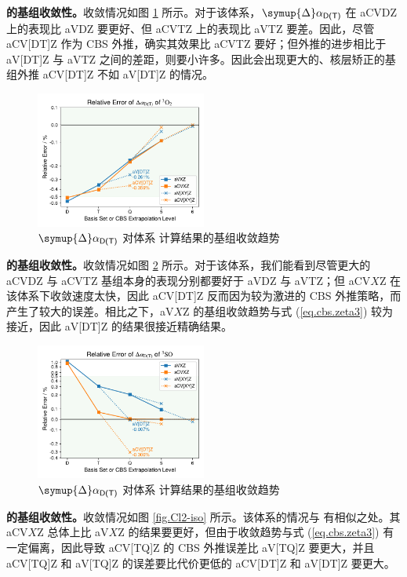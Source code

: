 \textbf{ 的基组收敛性。}收敛情况如图 \ref{fig.O2-iso} 所示。对于该体系，$\symup{\Delta} \alpha_\textsf{D(T)}$ 在 aCVDZ 上的表现比 aVDZ 要更好、但 aCVTZ 上的表现比 aVTZ 要差。因此，尽管 aCV[DT]Z 作为 CBS 外推，确实其效果比 aCVTZ 要好；但外推的进步相比于 aV[DT]Z 与 aVTZ 之间的差距，则要小许多。因此会出现更大的、核层矫正的基组外推 aCV[DT]Z 不如 aV[DT]Z 的情况。

\begin{figure}[!ht]
    \centering
    \includegraphics[width=0.5\textwidth]{assets/O2-iso.pdf}
    \caption{$\symup{\Delta} \alpha_\textsf{D(T)}$ 对体系  计算结果的基组收敛趋势}
    \label{fig.O2-iso}
\end{figure}

\textbf{ 的基组收敛性。}收敛情况如图 \ref{fig.SO-iso} 所示。对于该体系，我们能看到尽管更大的 aCVDZ 与 aCVTZ 基组本身的表现分别都要好于 aVDZ 与 aVTZ；但 aCV$X$Z 在该体系下收敛速度太快，因此 aCV[DT]Z 反而因为较为激进的 CBS 外推策略，而产生了较大的误差。相比之下，aV$X$Z 的基组收敛趋势与式 (\ref{eq.cbs.zeta3}) 较为接近，因此 aV[DT]Z 的结果很接近精确结果。

\begin{figure}[!ht]
    \centering
    \includegraphics[width=0.5\textwidth]{assets/SO-iso.pdf}
    \caption{$\symup{\Delta} \alpha_\textsf{D(T)}$ 对体系  计算结果的基组收敛趋势}
    \label{fig.SO-iso}
\end{figure}

\textbf{ 的基组收敛性。}收敛情况如图 \ref{fig.Cl2-iso} 所示。该体系的情况与  有相似之处。其 aCV$X$Z 总体上比 aV$X$Z 的结果要更好，但由于收敛趋势与式 (\ref{eq.cbs.zeta3}) 有一定偏离，因此导致 aCV[TQ]Z 的 CBS 外推误差比 aV[TQ]Z 要更大，并且 aCV[TQ]Z 和 aV[TQ]Z 的误差要比代价更低的 aCV[DT]Z 和 aV[DT]Z 要更大。


